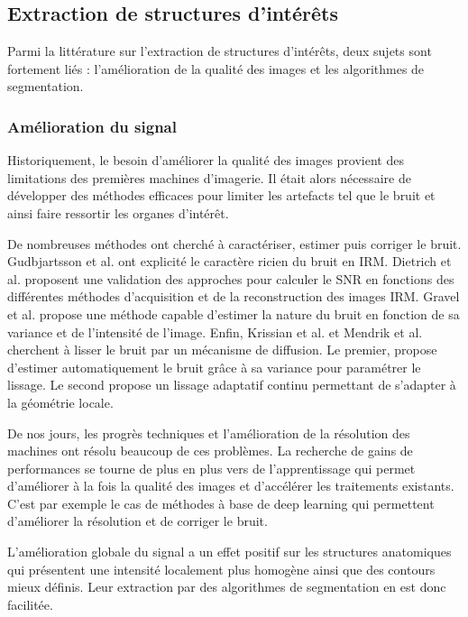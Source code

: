   \subsection{Extraction de structures d'intérêts}

      Parmi la littérature sur l'extraction de structures d'intérêts, deux sujets sont fortement liés : l'amélioration de la qualité des images et les algorithmes de segmentation.

    \subsubsection{Amélioration du signal}
      
    Historiquement, le besoin d'améliorer la qualité des images provient des limitations des premières machines d'imagerie. Il était alors nécessaire de développer des méthodes efficaces pour limiter les artefacts tel que le bruit et ainsi faire ressortir les organes d'intérêt. 
    
    De nombreuses méthodes ont cherché à caractériser, estimer puis corriger le bruit. Gudbjartsson et al. \cite{Gudbjartsson1995r_Rician_noise_MRI} ont explicité le caractère ricien du bruit en IRM. Dietrich et al. proposent une validation des approches pour calculer le SNR en fonctions des différentes méthodes d'acquisition et de la reconstruction des images IRM. Gravel et al. \cite{Gravel_2004_estimate_noise_medical_img} propose une méthode capable d'estimer la nature du bruit en fonction de sa variance et de l'intensité de l'image. Enfin, Krissian et al. \cite{Krissian_2009_diffusion_MRI}et Mendrik et al. \cite{Mendrik2009_HDCS} cherchent à lisser le bruit par un mécanisme de diffusion. Le premier, propose d'estimer automatiquement le bruit grâce à sa variance pour paramétrer le lissage. Le second propose un lissage adaptatif continu permettant de s'adapter à la géométrie locale.    
    
    De nos jours, les progrès techniques et l'amélioration de la résolution des machines ont résolu beaucoup de ces problèmes. La recherche de gains de performances se tourne de plus en plus vers de l'apprentissage qui permet d'améliorer à la fois la qualité des images et d'accélérer les traitements existants. C'est par exemple le cas de méthodes à base de deep learning \cite{Higaki2019_deep_MRI_CT_quality} qui permettent d'améliorer la résolution et de corriger le bruit.

    L'amélioration globale du signal a un effet positif sur les structures anatomiques qui présentent une intensité localement plus homogène ainsi que des contours mieux définis. Leur extraction par des algorithmes de segmentation en est donc facilitée.

